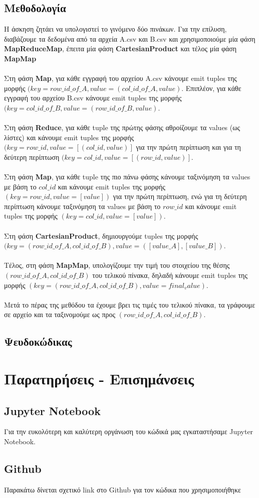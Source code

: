 \documentclass{ntua}
\begin{document}
\subsection{Μεθοδολογία}
H άσκηση ζητάει να υπολογιστεί το γινόμενο δύο πινάκων. Για την επίλυση, διαβάζουμε τα δεδομένα από τα αρχεία Α.csv και B.csv και χρησιμοποιούμε μία φάση \textbf{MapReduceMap}, έπειτα μία φάση \textbf{CartesianProduct} και τέλος μία φάση \textbf{MapMap}  \\ \\
Στη φάση \textbf{Map}, για κάθε εγγραφή του αρχείου A.csv κάνουμε emit tuples της μορφής $( key = row\_id\_of\_A, value =(col\_id\_of\_A,value)$. Επιπλέον, για κάθε εγγραφή του αρχείου Β.csv κάνουμε emit tuples της μορφής $( key = col\_id\_of\_B, value =(row\_id\_of\_B,value)$.  \\ \\
Στη φάση \textbf{Reduce}, για κάθε tuple της πρώτης φάσης αθροίζουμε τα values (ως λίστες) και κάνουμε emit tuples της μορφής $( key = row\_id, value =[(col\_id,value)]$ για την πρώτη περίπτωση και για τη δεύτερη περίπτωση $( key = col\_id, value =[(row\_id,value)]$. \\ \\
Στη φάση \textbf{Map}, για κάθε tuple της πιο πάνω φάσης κάνουμε ταξινόμηση τα values με βάση το $ col\_id$ και κάνουμε emit tuples της μορφής $( key = row\_id, value=[value])$ για την πρώτη περίπτωση, ενώ για τη δεύτερη περίπτωση κάνουμε ταξινόμηση τα values με βάση το $ row\_id$ και κάνουμε emit tuples της μορφής $( key = col\_id, value=[value])$.  \\ \\
Στη φάση \textbf{CartesianProduct}, δημιουργούμε tuples της μορφής $( key = (row\_id\_of\_A,col\_id\_of\_B), value = ([value\_A],[value\_B])$. \\ \\
Τέλος, στη φάση \textbf{MapMap}, υπολογίζουμε την τιμή του στοιχείου της θέσης $ (row\_id\_of\_A,col\_id\_of\_B) $ του τελικού πίνακα, δηλαδή κάνουμε emit tuples της μορφής $( key = (row\_id\_of\_A,col\_id\_of\_B), value = final_value)$. \\ \\
Μετά το πέρας της μεθόδου τα έχουμε βρει τις τιμές του τελικού πίνακα, τα γράφουμε σε αρχείο και τα ταξινομούμε ως προς $(row\_id\_of\_A,col\_id\_of\_B)$.  
\subsection{Ψευδοκώδικας}



\section{Παρατηρήσεις - Επισημάνσεις}

\subsection{Jupyter Notebook}
Για την ευκολότερη και καλύτερη οργάνωση του κώδικά μας εγκαταστήσαμε Jupyter Notebook.
\subsection{Github}
Παρακάτω δίνεται σχετικό link στο Github για τον κώδικα που χρησιμοποιήθηκε 
\end{document}
